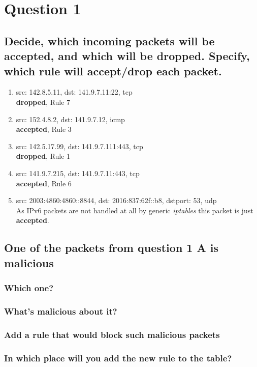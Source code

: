 \documentclass{report}
\begin{document}
	\section{Question 1}
	\startsection
		\renewcommand{\thesubsection}{\thesection.\Alph{subsection}}
		\subsection{Decide, which incoming packets will be accepted, and which will be dropped. Specify, which rule will accept/drop each packet.}
		\begin{enumerate}[-]
			\item src: 142.8.5.11, dst: 141.9.7.11:22, tcp \\ \textbf{dropped}, Rule 7
			\item src: 152.4.8.2, dst: 141.9.7.12, icmp \\ \textbf{accepted}, Rule 3
			\item src: 142.5.17.99, dst: 141.9.7.111:443, tcp \\ \textbf{dropped}, Rule 1
			\item src: 141.9.7.215, dst: 141.9.7.11:443, tcp \\ \textbf{accepted}, Rule 6
			\item src: 2003:4860:4860::8844, dst: 2016:837:62f::b8, dstport: 53, udp \\ As IPv6 packets are not handled at all by generic \textit{iptables} this packet is just \textbf{accepted}.
		\end{enumerate}
		\subsection{One of the packets from question 1 A is malicious}
		\startsubsection
			\subsubsection{Which one?}
			\startsubsection
			\closesection
			\subsubsection{What’s malicious about it?}
			\startsubsection
			\closesection
			\subsubsection{Add a rule that would block such malicious packets}
			\startsubsection
			\closesection
			\subsubsection{In which place will you add the new rule to the table?}
			\startsubsection
			\closesection
		\closesection
	\closesection
\end{document}
